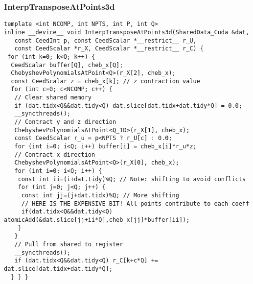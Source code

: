 \documentclass{beamer}
\begin{document}

\begin{frame}[fragile]
\begin{center}
\frametitle{InterpTransposeAtPoints3d}

{\tiny
\begin{lstlisting}[style=boxedC]
template <int NCOMP, int NPTS, int P, int Q>
inline __device__ void InterpTransposeAtPoints3d(SharedData_Cuda &dat,
   const CeedInt p, const CeedScalar *__restrict__ r_U,
   const CeedScalar *r_X, CeedScalar *__restrict__ r_C) {
 for (int k=0; k<Q; k++) {
  CeedScalar buffer[Q], cheb_x[Q];
  ChebyshevPolynomialsAtPoint<Q>(r_X[2], cheb_x);
  const CeedScalar z = cheb_x[k]; // z contraction value
  for (int c=0; c<NCOMP; c++) {
   // Clear shared memory
   if (dat.tidx<Q&&dat.tidy<Q) dat.slice[dat.tidx+dat.tidy*Q] = 0.0;
   __syncthreads();
   // Contract y and z direction
   ChebyshevPolynomialsAtPoint<Q_1D>(r_X[1], cheb_x);
   const CeedScalar r_u = p<NPTS ? r_U[c] : 0.0;
   for (int i=0; i<Q; i++) buffer[i] = cheb_x[i]*r_u*z;
   // Contract x direction
   ChebyshevPolynomialsAtPoint<Q>(r_X[0], cheb_x);
   for (int i=0; i<Q; i++) {
    const int ii=(i+dat.tidy)%Q; // Note: shifting to avoid conflicts
    for (int j=0; j<Q; j++) {
     const int jj=(j+dat.tidx)%Q; // More shifting
     // HERE IS THE EXPENSIVE BIT! All points contribute to each coeff
     if(dat.tidx<Q&&dat.tidy<Q) atomicAdd(&dat.slice[jj+ii*Q],cheb_x[jj]*buffer[ii]);
    }
   }
   // Pull from shared to register
   __syncthreads();
   if (dat.tidx<Q&&dat.tidy<Q) r_C[k+c*Q] += dat.slice[dat.tidx+dat.tidy*Q];
  } } }
\end{lstlisting}
}

\end{center}
\end{frame}

\end{document}
